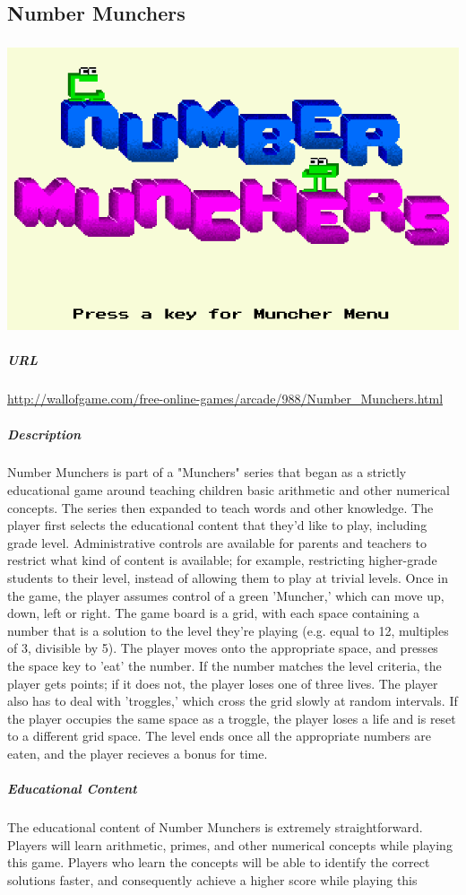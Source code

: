 \subsection{Number Munchers}\subparagraph{}\includegraphics[width = \textwidth]{img/munchers_title.png}\subparagraph{URL}\url{http://wallofgame.com/free-online-games/arcade/988/Number_Munchers.html}\subparagraph{Description}Number Munchers is part of a "Munchers" series that began as a strictly educational game around teaching children basic arithmetic and other numerical concepts. The series then expanded to teach words and other knowledge. The player first selects the educational content that they'd like to play, including grade level. Administrative controls are available for parents and teachers to restrict what kind of content is available; for example, restricting higher-grade students to their level, instead of allowing them to play at trivial levels. Once in the game, the player assumes control of a green 'Muncher,' which can move up, down, left or right. The game board is a grid, with each space containing a number that is a solution to the level they're playing (e.g. equal to 12, multiples of 3, divisible by 5). The player moves onto the appropriate space, and presses the space key to 'eat' the number. If the number matches the level criteria, the player gets points; if it does not, the player loses one of three lives. The player also has to deal with 'troggles,' which cross the grid slowly at random intervals. If the player occupies the same space as a troggle, the player loses a life and is reset to a different grid space. The level ends once all the appropriate numbers are eaten, and the player recieves a bonus for time.\subparagraph{Educational Content}The educational content of Number Munchers is extremely straightforward. Players will learn arithmetic, primes, and other numerical concepts while playing this game. Players who learn the concepts will be able to identify the correct solutions faster, and consequently achieve a higher score while playing this 